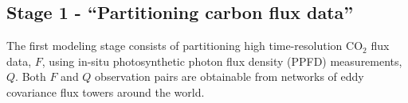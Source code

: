 \subsection{Stage 1 - ``Partitioning carbon flux data''}
\label{sec:ovstage1}
The first modeling stage consists of partitioning high time-resolution CO$_{2}$ flux data, $F$, using in-situ photosynthetic photon flux density (PPFD) measurements, $Q$.  
Both $F$ and $Q$ observation pairs are obtainable from networks of eddy covariance flux towers around the world.

